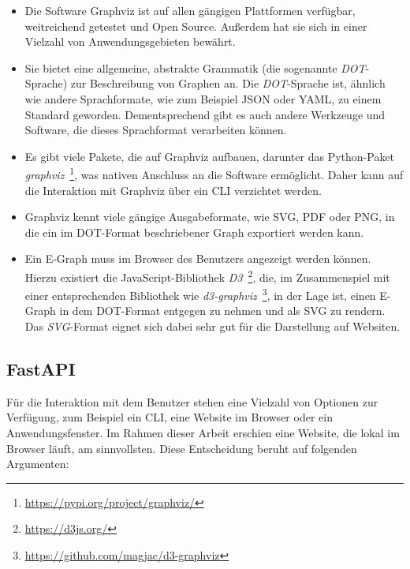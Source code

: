 \begin{itemize}
    \item Die Software Graphviz ist auf allen gängigen Plattformen verfügbar, weitreichend getestet und Open Source. Außerdem hat sie sich in einer Vielzahl von Anwendungsgebieten bewährt.
    \item Sie bietet eine allgemeine, abstrakte Grammatik (die sogenannte \textit{DOT}-Sprache) zur Beschreibung von Graphen an. Die \textit{DOT}-Sprache ist, ähnlich wie andere Sprachformate, wie
    zum Beispiel JSON oder YAML, zu einem Standard geworden. Dementsprechend gibt es auch andere Werkzeuge und Software, die dieses Sprachformat verarbeiten können.
    \item Es gibt viele Pakete, die auf Graphviz aufbauen, darunter das Python-Paket \textit{graphviz}~\footnote{\hspace{1.5mm}\url{https://pypi.org/project/graphviz/}}, was nativen Anschluss an die Software ermöglicht. 
    Daher kann auf die Interaktion mit Graphviz über ein CLI verzichtet werden.
    \item Graphviz kennt viele gängige Ausgabeformate, wie SVG, PDF oder PNG, in die ein im DOT-Format beschriebener Graph exportiert werden kann.
    \item Ein E-Graph muss im Browser des Benutzers angezeigt werden können. Hierzu existiert die JavaScript-Bibliothek \textit{D3}~\footnote{\hspace{1.5mm}\url{https://d3js.org/}}, die, im Zusammenspiel
    mit einer entsprechenden Bibliothek wie \textit{d3-graphviz}~\footnote{\hspace{1.5mm}\url{https://github.com/magjac/d3-graphviz}}, in der Lage ist, einen E-Graph in dem DOT-Format entgegen zu nehmen
    und als SVG zu rendern. Das \textit{SVG}-Format eignet sich dabei sehr gut für die Darstellung auf Websiten.
\end{itemize}

\subsection{FastAPI}

Für die Interaktion mit dem Benutzer stehen eine Vielzahl von Optionen zur Verfügung, zum Beispiel ein CLI, eine Website im Browser oder ein Anwendungsfenster.
Im Rahmen dieser Arbeit erschien eine Website, die lokal im Browser läuft, am sinnvollsten. Diese Entscheidung beruht auf folgenden Argumenten:

